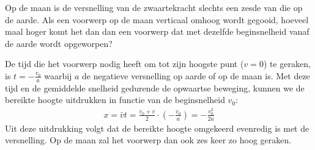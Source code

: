 
\begin{exercise}



 Op de maan is de versnelling van de zwaartekracht slechts een zesde van die op de aarde. Als een voorwerp op de maan verticaal omhoog wordt gegooid, hoeveel maal hoger komt het dan dan een voorwerp dat met dezelfde beginsnelheid vanaf de aarde wordt opgeworpen?

\begin{oplossing}
De tijd die het voorwerp nodig heeft om tot zijn hoogste punt ($v=0$) te geraken, is $t=-\frac{v_0}{a}$ waarbij $a$ de negatieve versnelling op aarde of op de maan is. Met deze tijd en de gemiddelde snelheid gedurende de opwaartse beweging, kunnen we de bereikte hoogte uitdrukken in functie van de beginsnelheid $v_0$:
\begin{eqnarray*}
x=\bar{v}t=\frac{v_0+v}{2}\cdot\left(-\frac{v_0}{a}\right)=-\frac{v_0^2}{2a}
\end{eqnarray*}
Uit deze uitdrukking volgt dat de bereikte hoogte omgekeerd evenredig is met de versnelling. Op de maan zal het voorwerp dan ook zes keer zo hoog geraken.
\end{oplossing}

\end{exercise}

